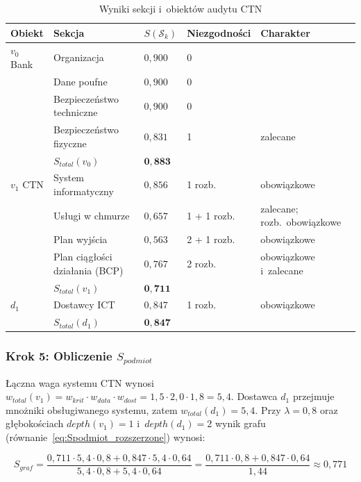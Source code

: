 \begin{table}[H]
\centering
\caption{Wyniki sekcji i~obiektów audytu CTN}
\label{tab:wyniki-sekcji}
\renewcommand{\arraystretch}{1.4}
\begin{tabular}{p{1.6cm}p{5.2cm}p{1.8cm}p{2.2cm}p{2.4cm}}
\toprule
\textbf{Obiekt} & \textbf{Sekcja} & \textbf{$S(\mathcal{S}_k)$} & \textbf{Niezgodności} & \textbf{Charakter} \\
\midrule
$v_0$ Bank & Organizacja & $0{,}900$ & 0 & \\
 & Dane poufne & $0{,}900$ & 0 & \\
 & Bezpieczeństwo techniczne & $0{,}900$ & 0 & \\
 & Bezpieczeństwo fizyczne & $0{,}831$ & 1 & zalecane \\
 & \textbf{$S_{total}(v_0)$} & $\mathbf{0{,}883}$ & & \\
\midrule
$v_1$ CTN & System informatyczny & $0{,}856$ & 1 rozb. & obowiązkowe \\
 & Usługi w chmurze & $0{,}657$ & 1 + 1 rozb. & zalecane; rozb.\ obowiązkowe \\
 & Plan wyjścia & $0{,}563$ & 2 + 1 rozb. & obowiązkowe \\
 & Plan ciągłości działania (BCP) & $0{,}767$ & 2 rozb. & obowiązkowe i~zalecane \\
 & \textbf{$S_{total}(v_1)$} & $\mathbf{0{,}711}$ & & \\
\midrule
$d_1$ & Dostawcy ICT & $0{,}847$ & 1 rozb. & obowiązkowe \\
 & \textbf{$S_{total}(d_1)$} & $\mathbf{0{,}847}$ & & \\
\bottomrule
\end{tabular}
\end{table}

\subsubsection*{Krok 5: Obliczenie $S_{podmiot}$}

Łączna waga systemu CTN wynosi $w_{total}(v_1) = w_{krit} \cdot w_{data} \cdot w_{dost} = 1{,}5 \cdot 2{,}0 \cdot 1{,}8 = 5{,}4$. Dostawca $d_1$ przejmuje mnożniki obsługiwanego systemu, zatem $w_{total}(d_1) = 5{,}4$. Przy $\lambda = 0{,}8$ oraz głębokościach $depth(v_1) = 1$ i~$depth(d_1) = 2$ wynik grafu (równanie~\eqref{eq:Spodmiot_rozszerzone}) wynosi:

\[
S_{graf} = \frac{0{,}711 \cdot 5{,}4 \cdot 0{,}8 + 0{,}847 \cdot 5{,}4 \cdot 0{,}64}{5{,}4 \cdot 0{,}8 + 5{,}4 \cdot 0{,}64}
= \frac{0{,}711 \cdot 0{,}8 + 0{,}847 \cdot 0{,}64}{1{,}44} \approx 0{,}771
\]

